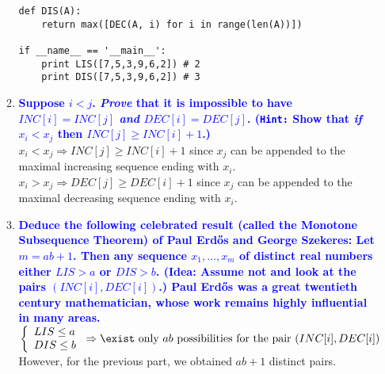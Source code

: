 \documentclass[11pt]{article}
\begin{document}
\begin{enumerate}
\begin{enumerate}
\begin{verbatim}
def DIS(A):
    return max([DEC(A, i) for i in range(len(A))])

if __name__ == '__main__':
    print LIS([7,5,3,9,6,2]) # 2
    print DIS([7,5,3,9,6,2]) # 3
        \end{verbatim}
        
    \item \textbf{\textcolor{blue}{Suppose $i<j$.  {\em Prove} that it is impossible to have $INC[i]=INC[j]$ {\em and} $DEC[i]=DEC[j]$.  ({\tt Hint:} Show that {\em if} $x_i < x_j$ then $INC[j] \geq INC[i] + 1$.)}}
        \\ $x_i < x_j \Rightarrow INC[j] \geq INC[i] + 1$ since $x_j$ can be appended to the maximal increasing sequence ending with $x_i$. 
        \\ $x_i > x_j \Rightarrow DEC[j] \geq DEC[i] + 1$ since $x_j$ can be appended to the maximal decreasing sequence ending with $x_i$. 
    \item \textbf{\textcolor{blue}{Deduce the following celebrated result (called the Monotone Subsequence Theorem) of Paul Erd\H{o}s and George Szekeres:  Let $m=ab+1$.  Then any sequence $x_1,\ldots,x_m$ of distinct real numbers either $LIS>a$ or $DIS>b$.  (Idea: Assume not and look at the pairs $(INC[i],DEC[i])$.)  Paul Erd\H{o}s was a great twentieth century mathematician,  whose work remains highly influential in many areas.}}
        \\ $\left\{
                \begin{array}{ll}
                    LIS \leq a \\
                    DIS \leq b
                \end{array}
            \right. \Rightarrow \exist \mbox{ only } ab \mbox{ possibilities for the pair }(INC[i], DEC[i])$
        \\ However, for the previous part, we obtained $ab + 1$ distinct pairs.
        
        
        
    \end{enumerate}
    

\end{enumerate}
\end{document}
